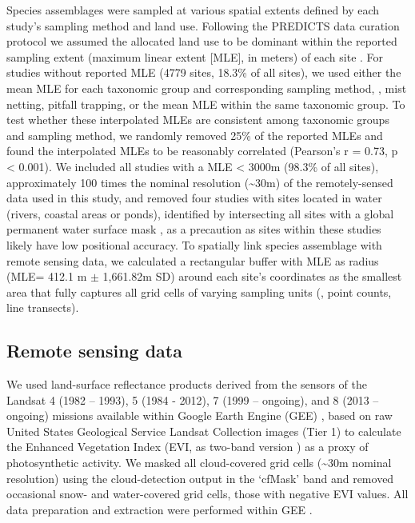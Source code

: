 Species assemblages were sampled at various spatial extents defined by each study’s sampling method and land use. Following the PREDICTS data curation protocol we assumed the allocated land use to be dominant within the reported sampling extent (maximum linear extent [MLE], in meters) of each site \citep{Hudson2014,Hudson2016}. For studies without reported MLE (4779 sites, 18.3\% of all sites), we used either the mean MLE for each taxonomic group and corresponding sampling method, \eg, mist netting, pitfall trapping, or the mean MLE within the same taxonomic group. To test whether these interpolated MLEs are consistent among taxonomic groups and sampling method, we randomly removed 25\% of the reported MLEs and found the interpolated MLEs to be reasonably correlated (Pearson’s r = 0.73, p < 0.001). We included all studies with a MLE < 3000m (98.3\% of all sites), approximately 100 times the nominal resolution (\textasciitilde 30m) of the remotely-sensed data used in this study, and removed four studies with sites located in water (rivers, coastal areas or ponds), identified by intersecting all sites with a global permanent water surface mask \citep{Pekel2016}, as a precaution as sites within these studies likely have low positional accuracy. To spatially link species assemblage with remote sensing data, we calculated a rectangular buffer with MLE as radius (MLE= 412.1 m $\pm$ 1,661.82m SD) around each site’s coordinates as the smallest area that fully captures all grid cells of varying sampling units (\eg, point counts, line transects). 

\subsection{Remote sensing data} 
\label{C03_0202}
We used land-surface reflectance products derived from the sensors of the Landsat 4 (1982 – 1993), 5 (1984 - 2012), 7 (1999 – ongoing), and 8 (2013 – ongoing) missions available within Google Earth Engine (GEE) \citep{Gorelick2017}, based on raw United States Geological Service Landsat Collection images (Tier 1) to calculate the Enhanced Vegetation Index (EVI, as two-band version \cite{Jiang2008}) as a proxy of photosynthetic activity. We masked all cloud-covered grid cells (\textasciitilde 30m nominal resolution) using the cloud-detection output in the ‘cfMask’ band \citep{Zhu2012} and removed occasional snow- and water-covered grid cells, \ie those with negative EVI values. All data preparation and extraction were performed within GEE \citep{Gorelick2017}.

